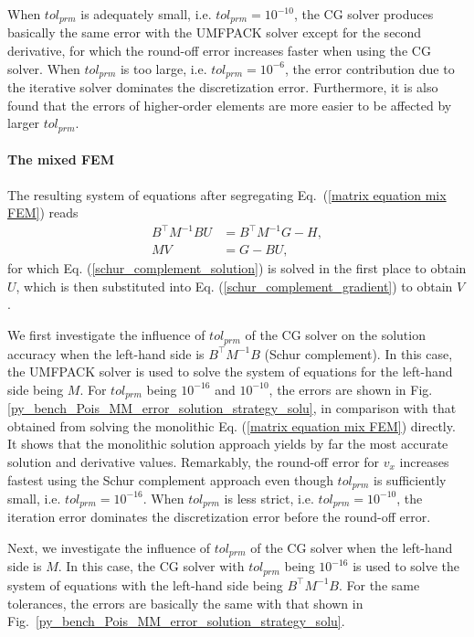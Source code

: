 \documentclass[review,3p]{elsarticle}
\begin{document}
When $tol_{prm}$ is adequately small, i.e. $tol_{prm}=10^{-10}$, the CG solver produces basically the same error with the UMFPACK solver except for the second derivative, for which the round-off error increases faster when using the CG solver.
When $tol_{prm}$ is too large, i.e. $tol_{prm}=10^{-6}$, the error contribution due to the iterative solver dominates the discretization error. Furthermore, it is also found that the errors of higher-order elements are more easier to be affected by larger $tol_{prm}$.

\paragraph{The mixed FEM}

The resulting system of equations after segregating Eq.~(\ref{matrix equation mix FEM}) reads
\begin{subequations}
 \begin{align}
  B^{\top} M^{-1} B U &= B^{\top} M^{-1} G - H, 	\label{schur_complement_solution} \\
  MV&=G-BU,						\label{schur_complement_gradient}
\end{align}						\label{schur_complement_solu_grad}%
\end{subequations}
for which Eq. (\ref{schur_complement_solution}) is solved in the first place to obtain $U$, which is then substituted into Eq. (\ref{schur_complement_gradient}) to obtain $V$.


We first investigate the influence of $tol_{prm}$ of the CG solver on the solution accuracy when the left-hand side is $B^{\top}M^{-1}B$ (Schur complement). In this case, the UMFPACK solver is used to solve the system of equations for the left-hand side being $M$.  
For $tol_{prm}$ being $10^{-16}$ and $10^{-10}$, the errors are shown in Fig. \ref{py_bench_Pois_MM_error_solution_strategy_solu}, in comparison with that obtained from solving the monolithic Eq. (\ref{matrix equation mix FEM}) directly.
It shows that the monolithic solution approach yields by far the most accurate solution and derivative values.
Remarkably, the round-off error for $v_{x}$ increases fastest using the Schur complement approach even though $tol_{prm}$ is sufficiently small, i.e. $tol_{prm}=10^{-16}$.
When $tol_{prm}$ is less strict, i.e. $tol_{prm}=10^{-10}$, the iteration error dominates the discretization error before the round-off error.

Next, we investigate the influence of $tol_{prm}$ of the CG solver when the left-hand side is $M$. In this case, the CG solver with $tol_{prm}$ being $10^{-16}$ is used to solve the system of equations with the left-hand side being $B^{\top}M^{-1}B$. For the same tolerances, the errors are basically the same with that shown in Fig.~\ref{py_bench_Pois_MM_error_solution_strategy_solu}.
\end{document}
